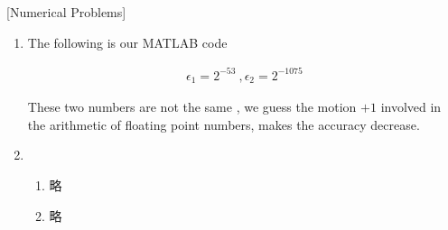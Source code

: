 \documentclass[12pt]{article}
\begin{document}
[Numerical Problems]
\begin{enumerate}

\item
The following is our MATLAB code\\
\lstset{language=Matlab,showstringspaces=false}

\begin{eqnarray*}
\epsilon_1 = 2^{-53} \ , \epsilon_2 = 2^{-1075}
\end{eqnarray*}

These two numbers are not the same , 
we guess the motion $+1$ involved in the arithmetic of floating point numbers, makes the accuracy decrease.\\

\item
\begin{enumerate}
\item
略
\item
略
\end{enumerate}
\end{enumerate}
\end{document}
